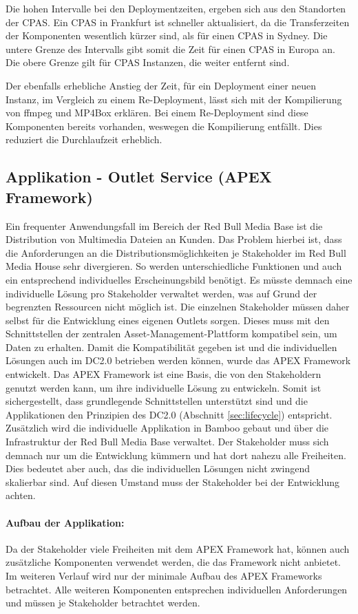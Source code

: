 Die hohen Intervalle bei den Deploymentzeiten, ergeben sich aus den Standorten der CPAS. Ein CPAS in Frankfurt ist schneller aktualisiert, da die Transferzeiten der Komponenten wesentlich kürzer sind, als für einen CPAS in Sydney. Die untere Grenze des Intervalls gibt somit die Zeit für einen CPAS in Europa an. Die obere Grenze gilt für CPAS Instanzen, die weiter entfernt sind.

Der ebenfalls erhebliche Anstieg der Zeit, für ein Deployment einer neuen Instanz, im Vergleich zu einem Re-Deployment, lässt sich mit der Kompilierung von ffmpeg und MP4Box erklären. Bei einem Re-Deployment sind diese Komponenten bereits vorhanden, weswegen die Kompilierung entfällt. Dies reduziert die Durchlaufzeit erheblich.

\subsection{Applikation - Outlet Service (APEX Framework)}
\label{sec:apex}
Ein frequenter Anwendungsfall im Bereich der Red Bull Media Base ist die Distribution von Multimedia Dateien an Kunden. Das Problem hierbei ist, dass die Anforderungen an die Distributionsmöglichkeiten je Stakeholder im Red Bull Media House sehr divergieren. So werden unterschiedliche Funktionen und auch ein entsprechend individuelles Erscheinungsbild benötigt. Es müsste demnach eine individuelle Lösung pro Stakeholder verwaltet werden, was auf Grund der begrenzten Ressourcen nicht möglich ist. Die einzelnen Stakeholder müssen daher selbst für die Entwicklung eines eigenen Outlets sorgen. Dieses muss mit den Schnittstellen der zentralen Asset-Management-Plattform kompatibel sein, um Daten zu erhalten. Damit die Kompatibilität gegeben ist und die individuellen Lösungen auch im DC2.0 betrieben werden können, wurde das APEX Framework entwickelt. Das APEX Framework ist eine Basis, die von den Stakeholdern genutzt werden kann, um ihre individuelle Lösung zu entwickeln. Somit ist sichergestellt, dass grundlegende Schnittstellen unterstützt sind und die Applikationen den Prinzipien des DC2.0 (Abschnitt \ref{sec:lifecycle}) entspricht. Zusätzlich wird die individuelle Applikation in Bamboo gebaut und über die Infrastruktur der Red Bull Media Base verwaltet. Der Stakeholder muss sich demnach nur um die Entwicklung kümmern und hat dort nahezu alle Freiheiten. Dies bedeutet aber auch, das die individuellen Lösungen nicht zwingend skalierbar sind. Auf diesen Umstand muss der Stakeholder bei der Entwicklung achten.

\paragraph{Aufbau der Applikation:}
Da der Stakeholder viele Freiheiten mit dem APEX Framework hat, können auch zusätzliche Komponenten verwendet werden, die das Framework nicht anbietet. Im weiteren Verlauf wird nur der minimale Aufbau des APEX Frameworks betrachtet. Alle weiteren Komponenten entsprechen individuellen Anforderungen und müssen je Stakeholder betrachtet werden.


